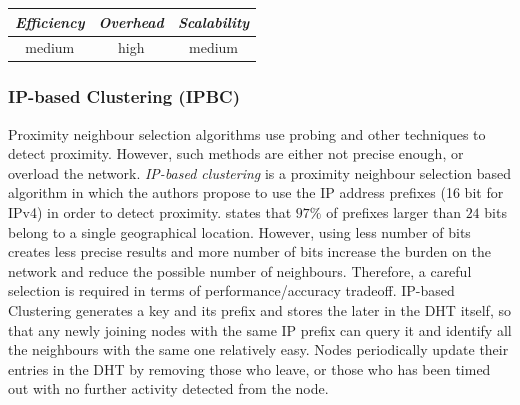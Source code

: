 %
%
%

\begin{center}
\begin{tabular}{ccc}
\emph{Efficiency} & \emph{Overhead} & \emph{Scalability} \\
\hline
medium &
high &
medium
\end{tabular}
\end{center}

\subsubsection{IP-based Clustering (IPBC)}
Proximity neighbour selection algorithms use probing and other techniques to
detect proximity. However, such methods are either not precise enough, or
overload the network. \emph{IP-based clustering} \cite{KM2007} is a proximity
neighbour selection based algorithm in which the authors propose to use the IP
address prefixes (16 bit for IPv4) in order to detect proximity.
\cite{freedman_iploc_2005} states that $97\%$ of prefixes larger than $24$ bits
belong to a single geographical location. However, using less number of bits
creates less precise results and more number of bits increase the burden on the
network and reduce the possible number of neighbours. Therefore, a careful
selection is required in terms of performance/accuracy tradeoff. IP-based
Clustering generates a key and its prefix and stores the later in the DHT
itself, so that any newly joining nodes with the same IP prefix can query it and
identify all the neighbours with the same one relatively easy. Nodes
periodically update their entries in the DHT by removing those who leave, or
those who has been timed out with no further activity detected from the node.

